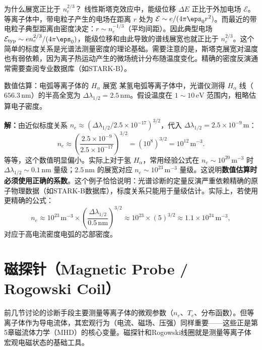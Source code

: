 \begin{insight}{为什么展宽正比于 $n_e^{2/3}$？}{}{}
线性斯塔克效应中，能级位移 $\Delta E$ 正比于外加电场 $\mathcal{E}$。等离子体中，带电粒子产生的电场在距离 $r$ 处为 $\mathcal{E} \sim e/(4\pi\eps_0 r^2)$。而最近的带电粒子典型距离由密度决定：$r \sim n_e^{-1/3}$（平均间距）。因此典型电场 $\mathcal{E}_{\mathrm{typ}} \sim e n_e^{2/3}/(4\pi\eps_0)$，能级位移和由此导致的谱线展宽也就正比于 $n_e^{2/3}$。这个简单的标度关系是光谱法测量密度的理论基础。需要注意的是，斯塔克展宽对温度也有弱依赖，因为离子热运动产生的微场统计分布随温度变化。精确的密度反演通常需要查阅专业数据库（如STARK-B）。
\end{insight}

\begin{example}{数值估算：电弧等离子体的 $H_\alpha$ 展宽}{}{}
某氢电弧等离子体中，光谱仪测得 $H_\alpha$ 线（$656.3\,\mathrm{nm}$）的半高全宽为 $\Delta\lambda_{1/2} = 2.5\,\mathrm{nm}$。假设温度在 $1\sim 10\,\mathrm{eV}$ 范围内，粗略估算电子密度。

\textbf{解：}由近似标度关系 $n_e \approx (\Delta\lambda_{1/2} / 2.5\times 10^{-17})^{3/2}$，代入 $\Delta\lambda_{1/2} = 2.5\times 10^{-9}\,\mathrm{m}$：
\begin{equation}
n_e \approx \left(\frac{2.5\times 10^{-9}}{2.5\times 10^{-17}}\right)^{3/2}
= (10^8)^{3/2} = 10^{12}\,\mathrm{m}^{-3}.
\end{equation}
等等，这个数值明显偏小。实际上对于氢 $H_\alpha$，常用经验公式在 $n_e \sim 10^{20}\,\mathrm{m}^{-3}$ 时 $\Delta\lambda_{1/2} \sim 0.1\,\mathrm{nm}$ 量级；$2.5\,\mathrm{nm}$ 的展宽对应 $n_e \sim 10^{23}\,\mathrm{m}^{-3}$ 量级。这说明\textbf{数值估算时必须使用正确的系数}。这个例子恰恰说明：光谱诊断的定量反演严重依赖精确的原子物理数据（如STARK-B数据库），标度关系只能用于量级估计。实际上，若使用更精确的公式：
\begin{equation}
n_e \approx 10^{23}\,\mathrm{m}^{-3}\times\left(\frac{\Delta\lambda_{1/2}}{0.5\,\mathrm{nm}}\right)^{3/2} \approx 10^{23}\times(5)^{3/2} \approx 1.1\times 10^{24}\,\mathrm{m}^{-3},
\end{equation}
对应于高电流密度电弧的芯部密度。
\end{example}


\section{磁探针（Magnetic Probe / Rogowski Coil）}
\label{sec:12.6}

前几节讨论的诊断手段主要测量等离子体的微观参数（$n_e$、$T_e$、分布函数）。但等离子体作为导电流体，其宏观行为（电流、磁场、压强）同样重要——这些正是第5章磁流体力学（MHD）的核心变量。磁探针和Rogowski线圈就是测量等离子体宏观电磁状态的基础工具。

